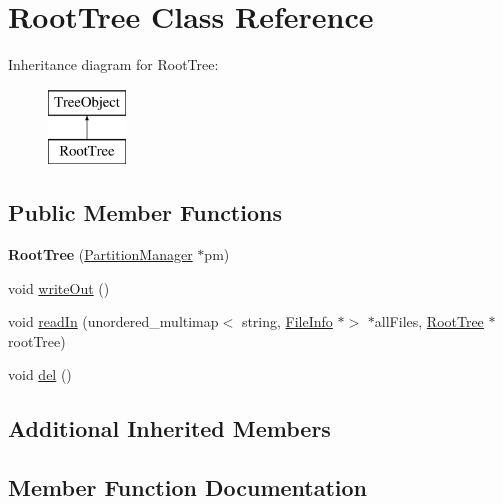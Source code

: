 \hypertarget{classRootTree}{}\section{Root\+Tree Class Reference}
\label{classRootTree}
Inheritance diagram for Root\+Tree\+:\begin{figure}[H]
\begin{center}
\leavevmode
\includegraphics[height=2.000000cm]{classRootTree}
\end{center}
\end{figure}
\subsection*{Public Member Functions}
\begin{DoxyCompactItemize}
\item 
\mbox{\label{classRootTree_a491c0374c9024faf1e1c8045f21a4cad}} 
{\bfseries Root\+Tree} (\mbox{\hyperlink{classPartitionManager}{Partition\+Manager}} $\ast$pm)
\item 
void \mbox{\hyperlink{classRootTree_a6df5a227c60c44ad84207eb296c52af9}{write\+Out}} ()
\item 
void \mbox{\hyperlink{classRootTree_a1d1084e9fc3333f10b3146d096da1dd4}{read\+In}} (unordered\+\_\+multimap$<$ string, \mbox{\hyperlink{classFileInfo}{File\+Info}} $\ast$$>$ $\ast$all\+Files, \mbox{\hyperlink{classRootTree}{Root\+Tree}} $\ast$root\+Tree)
\item 
void \mbox{\hyperlink{classRootTree_ac431dc04b767fc66791c251d8173650d}{del}} ()
\end{DoxyCompactItemize}
\subsection*{Additional Inherited Members}


\subsection{Member Function Documentation}
\mbox{\label{classRootTree_ac431dc04b767fc66791c251d8173650d}} 
